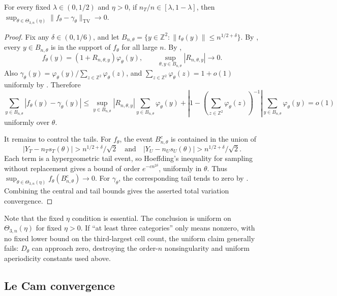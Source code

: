 \documentclass[12pt,reqno]{amsart}
\begin{document}
\begin{prop}\label{prop:tv}
For every fixed \(\lambda\in(0,1/2)\) and \(\eta>0\), if
\(n_T/n\in[\lambda,1-\lambda]\), then
\(
\sup_{\theta\in\Theta_{3,n}(\eta)}
\|f_\theta-\gamma_\theta\|_{\mathrm{TV}}
\to0.
\)
\end{prop}

\begin{proof}
Fix any \(\delta\in(0,1/6)\), and let
\(
B_{n,\theta}
=
\{y\in\mathbb Z^2:\|t_\theta(y)\|\le n^{1/2+\delta}\}.
\)
By , every \(y\in B_{n,\theta}\) is in the support of
\(f_\theta\) for all large \(n\).  By ,
\[
f_\theta(y)=(1+R_{n,\theta,y})\varphi_\theta(y),
\qquad
\sup_{\theta,y\in B_{n,\theta}}|R_{n,\theta,y}|\to0.
\]
Also \(\gamma_\theta(y)=\varphi_\theta(y)/\sum_{z\in\mathbb Z^2}\varphi_\theta(z)\),
and \(\sum_{z\in\mathbb Z^2}\varphi_\theta(z)=1+o(1)\) uniformly by
.  Therefore
\[
\sum_{y\in B_{n,\theta}}|f_\theta(y)-\gamma_\theta(y)|
\le
\sup_{y\in B_{n,\theta}}|R_{n,\theta,y}|
\sum_{y\in B_{n,\theta}}\varphi_\theta(y)
+
\left|1-\left(\sum_{z\in\mathbb Z^2}\varphi_\theta(z)\right)^{-1}\right|
\sum_{y\in B_{n,\theta}}\varphi_\theta(y)
=o(1)
\]
uniformly over \(\theta\).

It remains to control the tails.  For \(f_\theta\), the event
\(B_{n,\theta}^c\) is contained in the union of
\[
\left|Y_T-n_Ts_T(\theta)\right|>n^{1/2+\delta}/\sqrt2
\quad\text{and}\quad
\left|Y_U-n_Us_U(\theta)\right|>n^{1/2+\delta}/\sqrt2.
\]
Each term is a hypergeometric tail event, so Hoeffding's inequality for sampling
without replacement gives a bound of order \(e^{-c n^{2\delta}}\), uniformly in
\(\theta\).  Thus
\(
\sup_{\theta\in\Theta_{3,n}(\eta)}f_\theta(B_{n,\theta}^c)\to0.
\)
For \(\gamma_\theta\), the corresponding tail tends to zero by
.  Combining the central and tail bounds gives
the asserted total variation convergence.
\end{proof}

Note that the fixed \(\eta\) condition is essential.
The conclusion is uniform on \(\Theta_{3,n}(\eta)\) for fixed \(\eta>0\).  If
``at least three categories'' only means nonzero, with no fixed lower bound on
the third-largest cell count, the uniform claim generally fails: \(D_\theta\)
can approach zero, destroying the order-\(n\) nonsingularity and uniform
aperiodicity constants used above.

\subsection{Le Cam convergence}
\label{sec:lecamconv}
\end{document}
